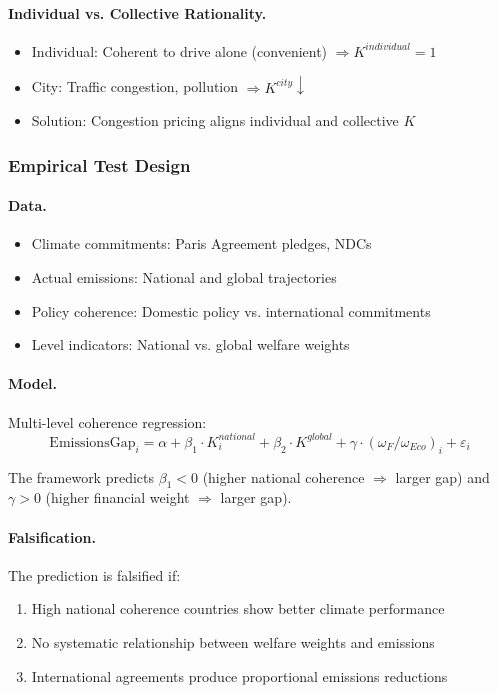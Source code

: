 \paragraph{Individual vs. Collective Rationality.}
\begin{itemize}
  \item Individual: Coherent to drive alone (convenient) $\Rightarrow K^{individual} = 1$
  \item City: Traffic congestion, pollution $\Rightarrow K^{city} \downarrow$
  \item Solution: Congestion pricing aligns individual and collective $K$
\end{itemize}

\subsubsection{Empirical Test Design}

\paragraph{Data.}
\begin{itemize}
  \item Climate commitments: Paris Agreement pledges, NDCs
  \item Actual emissions: National and global trajectories
  \item Policy coherence: Domestic policy vs. international commitments
  \item Level indicators: National vs. global welfare weights
\end{itemize}

\paragraph{Model.}
Multi-level coherence regression:
\begin{equation}
\text{EmissionsGap}_i = \alpha + \beta_1 \cdot K^{national}_i + \beta_2 \cdot K^{global} + \gamma \cdot (\omega_F/\omega_{Eco})_i + \varepsilon_i
\end{equation}

The framework predicts $\beta_1 < 0$ (higher national coherence $\Rightarrow$ larger gap) 
and $\gamma > 0$ (higher financial weight $\Rightarrow$ larger gap).

\paragraph{Falsification.}
The prediction is falsified if:
\begin{enumerate}
  \item High national coherence countries show better climate performance
  \item No systematic relationship between welfare weights and emissions
  \item International agreements produce proportional emissions reductions
\end{enumerate}

